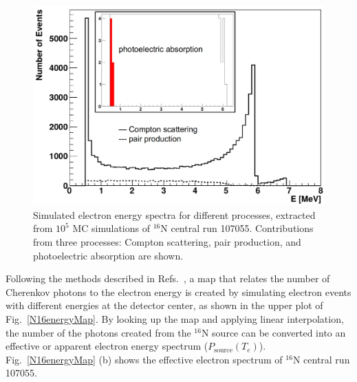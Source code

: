 \begin{figure}[htbp]
	\centering
	\includegraphics[width=12cm]{N16_MCenergySpectrum.png}
	\caption[Simulated electron energy spectra for different processes.]{Simulated electron energy spectra for different processes, extracted from $10^5$ MC simulations of $^{16}$N central run 107055. Contributions from three processes: Compton scattering, pair production, and photoelectric absorption are shown.\label{fig:N16nhitsSimu}}
\end{figure}

Following the methods described in Refs.~\cite{morganThesis,waterunidoc}, a map that relates the number of Cherenkov photons to the electron energy is created by simulating electron events with different energies at the detector center, as shown in the upper plot of Fig.~\ref{N16energyMap}. By looking up the map and applying linear interpolation, the number of the photons created from the $^{16}$N source can be converted into an effective or apparent electron energy spectrum ($P_\mathrm{source}(T_e)$)\cite{waterunidoc}. Fig.~\ref{N16energyMap} (b) shows the effective electron spectrum of $^{16}$N central run 107055.




